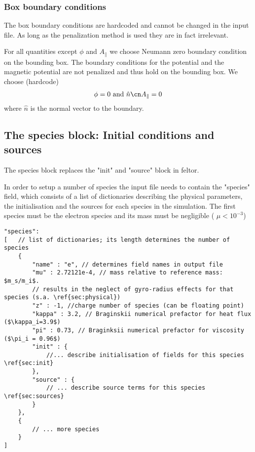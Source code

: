 \subsubsection{Box boundary conditions}
\begin{tcolorbox}[title=Note]
The box boundary conditions are hardcoded and cannot be changed in the input file.
As long as the penalization method is used they are in fact irrelevant.
\end{tcolorbox}
For all quantities except $\phi$ and $A_\parallel$ we choose Neumann zero boundary
condition on the bounding box.
The boundary conditions for the potential and the magnetic potential are not
penalized and thus hold on the bounding box. We choose (hardcode)
\begin{align}
\phi = 0
\text{ and }  \hat n \cn A_{\parallel} = 0
\end{align}
where $\hat n$ is the normal vector to the boundary.

\subsection{The species block: Initial conditions and sources} \label{sec:species}
The species block replaces the "init" and "source" block in feltor.

In order to setup a number of species the input file needs to contain the "species" field, which
consists of a list of dictionaries describing the physical parameters, the initialisation and the sources
for each species in the simulation. The first species must be the electron species and its mass
    must be negligible ( $\mu <10^{-3}$)
\begin{verbatim}
"species":
[   // list of dictionaries; its length determines the number of species
    {
        "name" : "e", // determines field names in output file
        "mu" : 2.72121e-4, // mass relative to reference mass: $m_s/m_i$.
        // results in the neglect of gyro-radius effects for that species (s.a. \ref{sec:physical})
        "z" : -1, //charge number of species (can be floating point)
        "kappa" : 3.2, // Braginskii numerical prefactor for heat flux ($\kappa_i=3.9$)
        "pi" : 0.73, // Braginksii numerical prefactor for viscosity ($\pi_i = 0.96$)
        "init" : {
            //... describe initialisation of fields for this species \ref{sec:init}
        },
        "source" : {
            // ... describe source terms for this species \ref{sec:sources}
        }
    },
    {
        // ... more species
    }
]
\end{verbatim}


